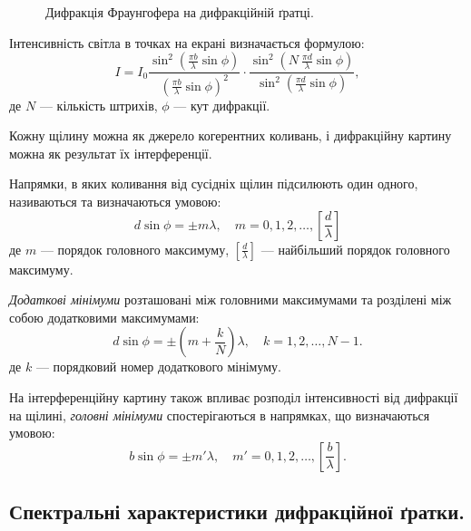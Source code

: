 \begin{figure}[hb!]\centering
    
    \caption{Дифракція Фраунгофера на дифракційній ґратці.}
    \label{pic:slots}
\end{figure}


Інтенсивність світла в точках на екрані визначається формулою:
\begin{equation}\label{eq:Difraction_I_slots}
    I = I_0 \frac{\sin^2\left( {\frac{\pi b}{\lambda} \sin\phi}\right)}{\left( \frac{\pi b}{\lambda} \sin\phi\right)^2} \cdot
    \frac{\sin^2\left( {N\ \frac{\pi d}{\lambda} \sin\phi}\right)}{\sin^2\left( \frac{\pi d}{\lambda} \sin\phi\right)},
\end{equation}
де $N$ --- кількість штрихів, $\phi$ --- кут дифракції.

Кожну щілину можна як джерело когерентних коливань, і дифракційну картину можна як результат їх інтерференції.

Напрямки, в яких коливання від сусідніх щілин підсилюють один одного, називаються  та визначаються умовою:
\begin{equation}\label{eq:Difraction_main_max}
    d\sin\phi=\pm m\lambda, \quad m = 0, 1, 2, \ldots, \left[\frac{d}{\lambda}\right]
\end{equation}
де $m$ --- порядок головного максимуму,  $\left[\frac{d}{\lambda}\right]$ --- найбільший порядок головного максимуму.

\emph{Додаткові мінімуми} розташовані між головними максимумами та розділені між собою додатковими максимумами:
\begin{equation}\label{eq:Difraction_add_min}
    d\sin\phi=\pm\left(m + \frac{k}{N}\right) \lambda, \quad k = 1, 2, \ldots, N - 1.
\end{equation}
де $k$ --- порядковий номер додаткового мінімуму.

На інтерференційну картину також впливає розподіл інтенсивності від дифракції на щілині, \emph{головні мінімуми} спостерігаються в напрямках, що визначаються умовою:
\begin{equation}\label{eq:Difraction_main_min}
    b\sin\phi= \pm m'\lambda, \quad m' = 0, 1, 2, \ldots, \left[ \frac{b}{\lambda}\right].
\end{equation}


\subsection*{Спектральні характеристики дифракційної ґратки.}

